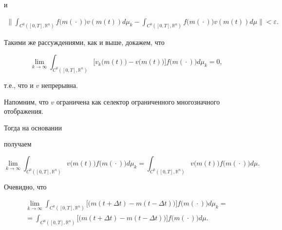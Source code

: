 и

\begin{gather*}

\biggl

\|\int_{C^0([0,T],\mathbb{R}^n)}

f\bigl(m({}\cdot{})\bigr)v(m(t))d\mu_k-

\int_{C^0([0,T],\mathbb{R}^n)}f\bigl(m({}\cdot{})\bigr)v(m(t))d\mu

\biggr

\|<\varepsilon.

\end{gather*}



Такими же рассуждениями, как и выше, докажем, что

$$

\lim\limits_{k\to\infty}\int_{C^0([0,T],\mathbb{R}^n)}

\bigl[v_k\bigl(m(t)\bigr)- v\bigl(m(t)\bigr)\bigr]f\bigl(m({}\cdot{})\bigr)d\mu_k=0,

$$

т.е., что и $v$ непрерывна.

Напомним, что $v$ ограничена как селектор ограниченного многозначного отображения.



Тогда на основании \cite[теорема~2, \S~1, гл.~VI]{popovkoval:bib:GS}

получаем

$$

\lim\limits_{k\to\infty}\int_{C^0([0,T],\mathbb{R}^n)}

v\bigl(m(t) \bigr)  f\bigl(m({}\cdot{})\bigr)d\mu_k=\int_{C^0([0,T],\mathbb{R}^n)}

v\bigl(m(t) \bigr)  f\bigl(m({}\cdot{})\bigr)d\mu.

$$

Очевидно, что

\begin{multline}

\lim\limits_{k\to\infty}\int_{C^0([0,T],\mathbb{R}^n)} 

\bigl[\bigl(m(t+\Delta t)-m(t-\Delta t)\bigr)\bigr]f\bigl(m({}\cdot{})\bigr)

d\mu_k

=

\\

=\int_{C^0([0,T],\mathbb{R}^n)}

\bigl[\bigl(m(t+\Delta t)-m(t-\Delta t)\bigr)\bigr]f\bigl(m({}\cdot{})\bigr)d\mu.

\end{multline}

